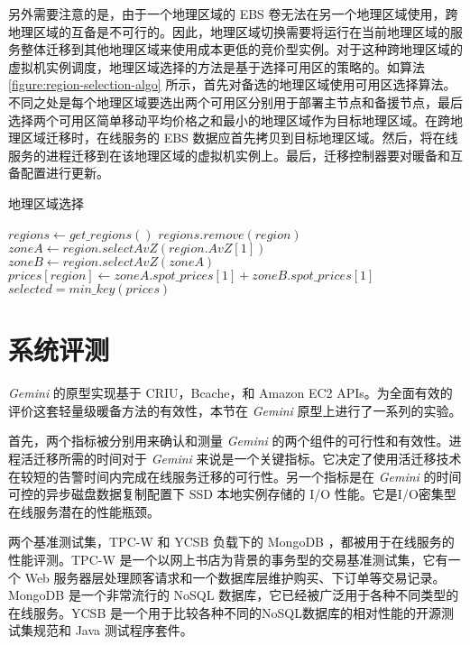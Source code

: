 另外需要注意的是，由于一个地理区域的 EBS 卷无法在另一个地理区域使用，跨地理区域的互备是不可行的。因此，地理区域切换需要将运行在当前地理区域的服务整体迁移到其他地理区域来使用成本更低的竞价型实例。对于这种跨地理区域的虚拟机实例调度，地理区域选择的方法是基于选择可用区的策略的。如算法 \ref{figure:region-selection-algo} 所示，首先对备选的地理区域使用可用区选择算法。不同之处是每个地理区域要选出两个可用区分别用于部署主节点和备援节点，最后选择两个可用区简单移动平均价格之和最小的地理区域作为目标地理区域。在跨地理区域迁移时，在线服务的 EBS 数据应首先拷贝到目标地理区域。然后，将在线服务的进程迁移到在该地理区域的虚拟机实例上。最后，迁移控制器要对暖备和互备配置进行更新。

\begin{algorithm}
\caption{地理区域选择}
\label{figure:region-selection-algo}

$regions\gets get\_regions()$
{
  {
    $regions.remove(region)$\;
  }
}
{
  $zoneA\gets region.selectAvZ(region.AvZ[1])$\;
  $zoneB\gets region.selectAvZ(zoneA)$\;
  $prices[region]\gets zoneA.spot\_prices[1] + zoneB.spot\_prices[1]$\;
}
$selected = min\_key(prices)$\;
\;
\end{algorithm}

\section{系统评测}
\emph{Gemini} 的原型实现基于 CRIU，Bcache，和 Amazon EC2 APIs。为全面有效的评价这套轻量级暖备方法的有效性，本节在 \emph{Gemini} 原型上进行了一系列的实验。

首先，两个指标被分别用来确认和测量 \emph{Gemini} 的两个组件的可行性和有效性。进程活迁移所需的时间对于 \emph{Gemini} 来说是一个关键指标。它决定了使用活迁移技术在较短的告警时间内完成在线服务迁移的可行性。另一个指标是在 \emph{Gemini} 的时间可控的异步磁盘数据复制配置下 SSD 本地实例存储的 I/O 性能。它是I/O密集型在线服务潜在的性能瓶颈。

两个基准测试集，TPC-W \cite{TPCW:2014} 和 YCSB \cite{YCSB:2014} 负载下的 MongoDB \cite{Mongodb:2014}，都被用于在线服务的性能评测。TPC-W 是一个以网上书店为背景的事务型的交易基准测试集，它有一个 Web 服务器层处理顾客请求和一个数据库层维护购买、下订单等交易记录。MongoDB 是一个非常流行的 NoSQL 数据库，它已经被广泛用于各种不同类型的在线服务。YCSB 是一个用于比较各种不同的NoSQL数据库的相对性能的开源测试集规范和 Java 测试程序套件。

